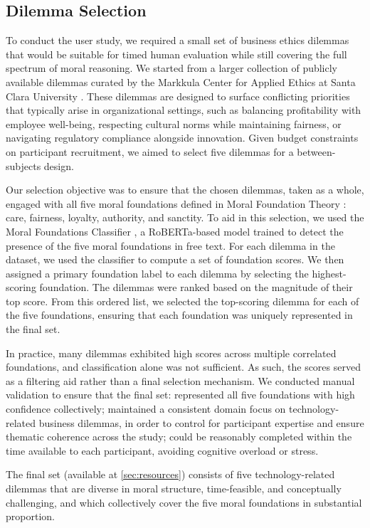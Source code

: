 \subsection{Dilemma Selection}
\label{sec:dilemmas}

To conduct the user study, we required a small set of business ethics dilemmas that would be suitable for timed human evaluation while still covering the full spectrum of moral reasoning. We started from a larger collection of publicly available dilemmas curated by the Markkula Center for Applied Ethics at Santa Clara University \cite{scu}.
These dilemmas are designed to surface conflicting priorities that typically arise in organizational settings, such as balancing profitability with employee well-being, respecting cultural norms while maintaining fairness, or navigating regulatory compliance alongside innovation.
Given budget constraints on participant recruitment, we aimed to select five dilemmas for a between-subjects design.

Our selection objective was to ensure that the chosen dilemmas, taken as a whole, engaged with all five moral foundations defined in Moral Foundation Theory \cite{GRAHAM201355}: care, fairness, loyalty, authority, and sanctity. To aid in this selection, we used the Moral Foundations Classifier \cite{ardag2024moral}, a RoBERTa-based model trained to detect the presence of the five moral foundations in free text.
For each dilemma in the dataset, we used the classifier to compute a set of foundation scores. We then assigned a primary foundation label to each dilemma by selecting the highest-scoring foundation. The dilemmas were ranked based on the magnitude of their top score. From this ordered list, we selected the top-scoring dilemma for each of the five foundations, ensuring that each foundation was uniquely represented in the final set.

In practice, many dilemmas exhibited high scores across multiple correlated foundations, and classification alone was not sufficient. As such, the scores served as a filtering aid rather than a final selection mechanism.
We conducted manual validation to ensure that the final set:
represented all five foundations with high confidence collectively;
maintained a consistent domain focus on technology-related business dilemmas, in order to control for participant expertise and ensure thematic coherence across the study;
could be reasonably completed within the time available to each participant, avoiding cognitive overload or stress.

The final set (available at \ref{sec:resources}) consists of five technology-related dilemmas that are diverse in moral structure, time-feasible, and conceptually challenging, and which collectively cover the five moral foundations in substantial proportion.
